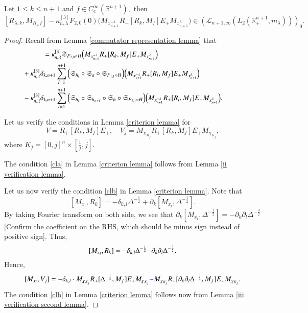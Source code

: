 \documentclass[12pt]{amsart}
\begin{document}
\begin{lemma}\label{first approximate lemma} Let $1\leq k\leq n+1$ and $f\in C^{\infty}_c(\mathbb{R}^{n+1}),$ then
$$[R_{\lambda,k},M_{R_+f}]-\kappa_{n,\lambda}^{[3]}F_{2,0}(0)\Big( M_{x_{n+1}^{-\lambda}} R_+[R_k,M_f]E_+ M_{x_{n+1}^{\lambda}}\Big)\in (\mathcal{L}_{n+1,\infty}(L_2(\mathbb{R}^{n+1}_+,m_{\lambda})))_0.$$
\end{lemma}
\begin{proof} Recall from Lemma \ref{commutator representation lemma} that
\begin{align*}
[R_{\lambda,k},M_{R_+f}]&=\kappa_{n,\lambda}^{[3]}\mathfrak{S}_{F_{2,0}\circ H}\Big( M_{x_{n+1}^{-\lambda}} R_+[R_k,M_{f}]E_+ M_{x_{n+1}^{\lambda}}\Big)\\
&\hspace{-1.0cm}+\kappa_{n,\lambda}^{[3]}\delta_{k,n+1}\sum_{l=1}^{n+1}\Big(\mathfrak{S}_{h_l}\circ\mathfrak{S}_a\circ\mathfrak{S}_{F_{1,1}\circ H}\Big)\Big(M_{x_{n+1}^{-\lambda}} R_+[R_l,M_{f}]E_+ M_{x_{n+1}^{\lambda}}\Big)\\
&\hspace{-1.0cm}-\kappa_{n,\lambda}^{[3]}\delta_{k,n+1}\sum_{l=1}^{n+1}\Big(\mathfrak{S}_{h_l}\circ\mathfrak{S}_{h_{n+1}}\circ\mathfrak{S}_b\circ\mathfrak{S}_{F_{2,1}\circ H}\Big)\Big( M_{x_{n+1}^{-\lambda}} R_+[R_l,M_{f}]E_+ M_{x_{n+1}^{\lambda}}\Big).
\end{align*}

Let us verify the conditions in Lemma \ref{criterion lemma} for
$$V=R_+[R_k,M_f]E_+,\quad V_j=M_{\chi_{K_j}}R_+[R_k,M_f]E_+M_{\chi_{K_j}},$$
where $K_j=[0,j]^n\times[\frac1j,j].$

{\color{blue}The condition \eqref{cla} in Lemma \ref{criterion lemma} follows from Lemma \ref{ii verification lemma}.}

Let us now verify the condition \eqref{clb} in Lemma \ref{criterion lemma}. Note that
$$[M_{x_l},R_k]=-\delta_{k,l}\Delta^{-\frac12}+\partial_k[M_{x_l},\Delta^{-\frac12}].$$
By taking Fourier transform on both side, we see that $\partial_k[M_{x_l},\Delta^{-\frac12}]=-\partial_k\partial_l\Delta^{-\frac32}$ {\color{blue}[Confirm the coefficient on the RHS, which should be minus sign instead of positive sign]}. Thus,
$$[M_{x_l},R_k]=-\delta_{k,l}\Delta^{-\frac12}{\color{blue}-}\partial_k\partial_l\Delta^{-\frac32}.$$
Hence,
$$[M_{x_l},V_j]=-\delta_{k,l}\cdot M_{\chi_{K_j}}R_+[\Delta^{-\frac12},M_f]E_+M_{\chi_{K_j}}{\color{blue}-}M_{\chi_{K_j}}R_+[\partial_k\partial_l\Delta^{-\frac32},M_f]E_+M_{\chi_{K_j}}.$$
The condition \eqref{clb} in Lemma \ref{criterion lemma} follows now from Lemma \ref{iii verification second lemma}.


\end{proof}
\end{document}
